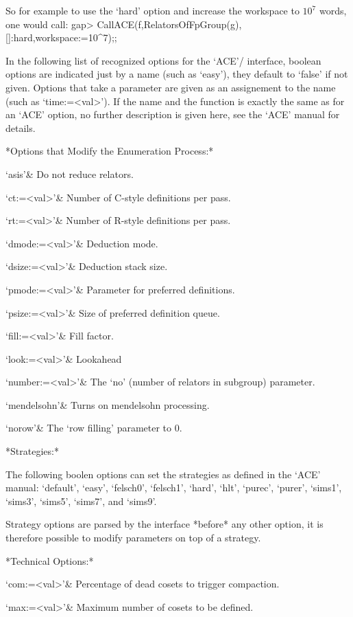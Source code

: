 So for example to use the `hard' option and increase the workspace to $10^7$
words, one would call:
\begintt
gap> CallACE(f,RelatorsOfFpGroup(g),[]:hard,workspace:=10^7);;
\endtt

In the following list of recognized options for
the `ACE'/{\GAP} interface, boolean options are indicated just by a name
(such as `easy'), they default to `false' if not given. Options that take a
parameter are given as an assignement to the name (such as `time:=<val>').
If the name and the function is exactly the same as for an `ACE' option, no
further description is given here, see the `ACE' manual for details.

*Options that Modify the Enumeration Process:*

\beginitems
`asis'&
Do not reduce relators.

`ct:=<val>'&
Number of C-style definitions per pass.

`rt:=<val>'&
Number of R-style definitions per pass.

`dmode:=<val>'&
Deduction mode.

`dsize:=<val>'&
Deduction stack size.

`pmode:=<val>'&
Parameter for preferred definitions.

`psize:=<val>'&
Size of preferred definition queue.

`fill:=<val>'&
Fill factor.

`look:=<val>'&
Lookahead

`number:=<val>'&
The `no' (number of relators in subgroup) parameter.

`mendelsohn'&
Turns on mendelsohn processing.

`norow'&
The `row filling' parameter to 0.

\enditems

*Strategies:*

The following boolen options can set the strategies as defined in the  `ACE'
manual: `default', `easy', `felsch0', `felsch1', `hard', `hlt', `purec',
`purer', `sims1', `sims3', `sims5', `sims7', and `sims9'.

Strategy options are parsed by the interface *before* any other option, it
is therefore possible to modify parameters on top of a strategy.

*Technical Options:*

\beginitems
`com:=<val>'&
Percentage of dead cosets to trigger compaction.

`max:=<val>'&
Maximum number of cosets to be defined.

